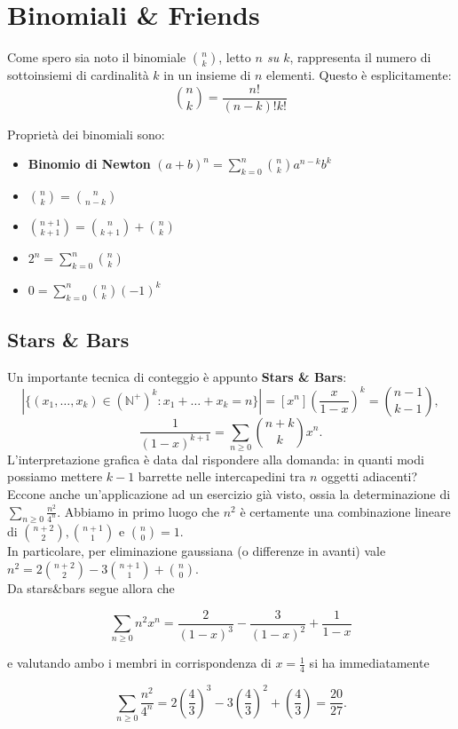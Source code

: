 \documentclass[a4paper,twoside]{article}
\newcommand{\N}{\mathbb{N}}
\theoremstyle{definition}
\numberwithin{theorem}{section}
\begin{document}
\section{Binomiali \& Friends}
Come spero sia noto il binomiale $\binom{n}{k}$, letto \emph{$n$ su $k$}, rappresenta il numero di sottoinsiemi di cardinalità $k$ in un insieme di $n$ elementi.
Questo è esplicitamente:\\
$$\binom{n}{k} = \frac{n!}{(n-k)!k!}$$    

Proprietà dei binomiali sono: 
\begin{itemize}
    \item \textbf{Binomio di Newton} $(a+b)^n=\sum_{k=0}^{n}\binom{n}{k}a^{n-k}b^k$
    \item $\binom{n}{k}=\binom{n}{n-k}$
    \item $\binom{n+1}{k+1}=\binom{n}{k+1} + \binom{n}{k}$
    \item $2^n= \sum_{k=0}^{n}\binom{n}{k}$
    \item $0 = \sum_{k=0}^{n}\binom{n}{k}(-1)^k$
\end{itemize}

\subsection{Stars \& Bars}
Un importante tecnica di conteggio è appunto \textbf{Stars \& Bars}:
$$\left|\{(x_1,\ldots,x_k)\in(\N^+)^k: x_1+\ldots+x_k = n\}\right|=[x^n]\left(\frac{x}{1-x}\right)^k = \binom{n-1}{k-1},$$
$$ \frac{1}{(1-x)^{k+1}}=\sum_{n\geq 0}\binom{n+k}{k}x^n. $$
L'interpretazione grafica è data dal rispondere alla domanda: in quanti modi possiamo mettere $k-1$ barrette nelle intercapedini tra $n$ oggetti adiacenti? Eccone anche un'applicazione ad un esercizio già visto, ossia la determinazione di $\sum_{n\geq 0}\frac{n^2}{4^n}$. Abbiamo in primo luogo che $n^2$ è certamente una combinazione lineare di $\binom{n+2}{2},\binom{n+1}{1}$ e $\binom{n}{0}=1$.\\ In particolare, per eliminazione gaussiana (o differenze in avanti) vale $n^2=2\binom{n+2}{2}-3\binom{n+1}{1}+\binom{n}{0}$.\\ Da stars\&bars segue allora che 

$$ \sum_{n\geq 0} n^2 x^n = \frac{2}{(1-x)^3}-\frac{3}{(1-x)^2}+\frac{1}{1-x} $$

e valutando ambo i membri in corrispondenza di $x=\frac{1}{4}$ si ha immediatamente 

$$ \sum_{n\geq 0}\frac{n^2}{4^n} = 2\left(\frac{4}{3}\right)^3-3\left(\frac{4}{3}\right)^2+\left(\frac{4}{3}\right)=\frac{20}{27}.$$
\\
\end{document}
